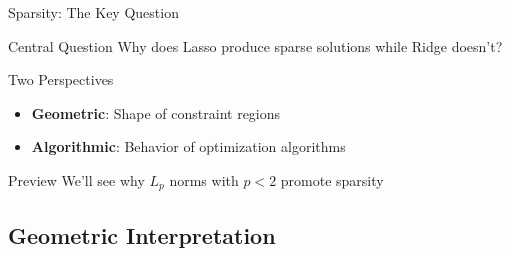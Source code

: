 \documentclass{beamer}
\begin{document}
\begin{frame}{Sparsity: The Key Question}
\begin{alertbox}{Central Question}
Why does Lasso produce sparse solutions while Ridge doesn't?
\end{alertbox}
\pause

\begin{keypointsbox}{Two Perspectives}
\begin{itemize}
\item \textbf{Geometric}: Shape of constraint regions
\item \textbf{Algorithmic}: Behavior of optimization algorithms
\end{itemize}
\end{keypointsbox}
\pause

\begin{examplebox}{Preview}
We'll see why $L_p$ norms with $p < 2$ promote sparsity
\end{examplebox}
\end{frame}

\subsection{Geometric Interpretation}
\end{document}

